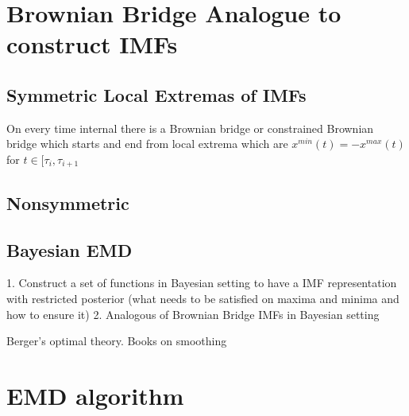 \documentclass[article,moreauthors,pdftex,10pt,a4paper]{ssrn}
\begin{document}
\section{Brownian Bridge Analogue to  construct IMFs}
\subsection{Symmetric Local Extremas of IMFs} 
On every time internal there is a Brownian bridge or constrained Brownian bridge which starts and end from local extrema which are $x^{min} (t)= -x^{max}(t)$ for $t \in [\tau_i,\tau_{i+1}$
\subsection{Nonsymmetric}

\subsection{Bayesian EMD}
1. Construct a set of functions in Bayesian setting to have a IMF representation with restricted posterior (what needs to be satisfied on maxima and minima and how to ensure it)
2. Analogous of Brownian Bridge IMFs in Bayesian setting

Berger's optimal theory. Books on smoothing
\section{EMD algorithm}
\end{document}
